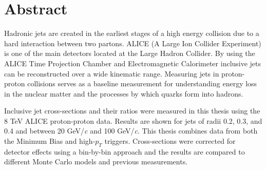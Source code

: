 \chapter*{Abstract}\label{ch:abstract}

Hadronic jets are created in the earliest stages of a high energy collision due to a hard interaction between two partons.  ALICE (A Large Ion Collider Experiment) is one of the main detectors located at the Large Hadron Collider.  By using the ALICE Time Projection Chamber and Electromagnetic Calorimeter inclusive jets can be reconstructed over a wide kinematic range.  Measuring jets in proton-proton collisions serves as a baseline measurement for understanding energy loss in the nuclear matter and the processes by which quarks form into hadrons.  

Inclusive jet cross-sections and their ratios were measured in this thesis using the 8 TeV ALICE proton-proton data.  Results are shown for jets of radii 0.2, 0.3, and 0.4 and between 20 GeV/\textit{c} and 100 GeV/\textit{c}.  This thesis combines data from both the Minimum Bias and high-$p_{T}$ triggers.  Cross-sections were corrected for detector effects using a bin-by-bin approach and the results are compared to different Monte Carlo models and previous measurements. 